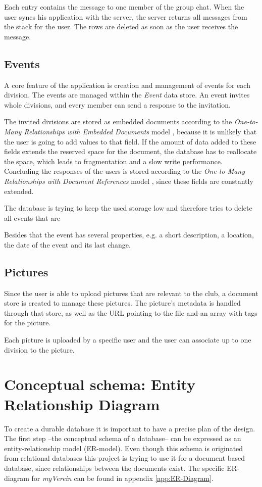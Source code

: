 Each entry contains the message to one member of the group chat. When the user syncs his application with the server, the server returns all messages from the stack for the user. The rows are deleted as soon as the user receives the message. 

\subsection{Events}
A core feature of the application is creation and management of events for each division. The events are managed within the \emph{Event} data store. An event invites whole divisions, and every member can send a response to the invitation. 

The invited divisions are stored as embedded documents according to the \emph{One-to-Many Relationships with Embedded Documents} model \cite[p. 141]{Mongo:2014aa}, because it is unlikely that the user is going to add values to that field. If the amount of data added to these fields extends the reserved space for the document, the database has to reallocate the space, which leads to fragmentation and a slow write performance. Concluding the responses of the users is stored according to the \emph{One-to-Many Relationships with Document References} model \cite[p. 143]{Mongo:2014aa}, since these fields are constantly extended.

The database is trying to keep the used storage low and therefore tries to delete all events that are 

Besides that the event has several properties, e.g. a short description, a location, the date of the event and its last change.

\subsection{Pictures}
Since the user is able to upload pictures that are relevant to the club, a document store is created to manage these pictures. The picture's metadata is handled through that store, as well as the URL pointing to the file and an array with tags for the picture.

Each picture is uploaded by a specific user and the user can associate up to one division to the picture.
 
\section{Conceptual schema: Entity Relationship Diagram}
To create a durable database it is important to have a precise plan of the design. The first step --the conceptual schema of a database-- can be expressed as an entity-relationship model (ER-model). Even though this schema is originated from relational databases this project is trying to use it for a document based database, since relationships between the documents exist. The specific ER-diagram for \emph{myVerein} can be found in appendix \vref{app:ER-Diagram}.

